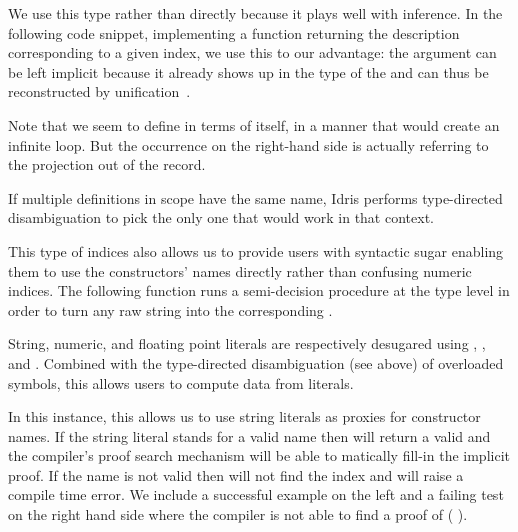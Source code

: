 
We use this type rather than  directly because it
plays well with inference.
%
In the following code snippet, implementing a function returning
the description corresponding to a given index,
we use this to our advantage:
the  argument can be left implicit because it already
shows up in the type of the  and can thus be
reconstructed by unification~\citep{DBLP:conf/tlca/AbelP11}.


Note that we seem to define 
in terms of itself, in a manner that would create an
infinite loop.
%
But the occurrence on the right-hand side is actually
referring to the projection out of the
 record.

\begin{remark}
  If multiple definitions in scope have the same name,
  Idris performs type-directed disambiguation to pick
  the only one that would work in that context.
\end{remark}

This type of indices also allows us to provide users with
syntactic sugar enabling them to use the constructors' names
directly rather than confusing numeric indices.
%
The following function runs a semi-decision procedure
 at the type level
in order to turn any raw string 
into the corresponding .


\begin{remark}
  String, numeric, and floating point literals are respectively
  desugared using , , and
  .
  Combined with the type-directed disambiguation (see above)
  of overloaded symbols, this allows users to compute data from literals.
\end{remark}

In this instance, this allows us to use string literals as
proxies for constructor names.
%
If the string literal stands for a valid name then
 will
return a valid  and the compiler's proof
search mechanism will be able to
matically fill-in the implicit proof.
%
If the name is not valid then \idris{} will not
find the index and will raise a compile time error.
%
We include a successful example on the left and a failing test
on the right hand side where the compiler is not able to find
a proof of ( \IdrisKeyword{(}
 
\IdrisKeyword{)}).

